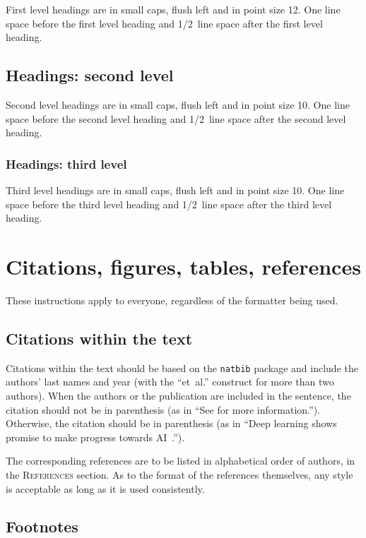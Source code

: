 \documentclass{article} %
\begin{document}
First level headings are in small caps,
flush left and in point size 12. One line space before the first level
heading and 1/2~line space after the first level heading.

\subsection{Headings: second level}

Second level headings are in small caps,
flush left and in point size 10. One line space before the second level
heading and 1/2~line space after the second level heading.

\subsubsection{Headings: third level}

Third level headings are in small caps,
flush left and in point size 10. One line space before the third level
heading and 1/2~line space after the third level heading.

\section{Citations, figures, tables, references}
\label{others}

These instructions apply to everyone, regardless of the formatter being used.

\subsection{Citations within the text}

Citations within the text should be based on the {\tt natbib} package
and include the authors' last names and year (with the ``et~al.'' construct
for more than two authors). When the authors or the publication are
included in the sentence, the citation should not be in parenthesis (as
in ``See \citet{Hinton06} for more information.''). Otherwise, the citation
should be in parenthesis (as in ``Deep learning shows promise to make progress towards AI~\citep{Bengio+chapter2007}.'').

The corresponding references are to be listed in alphabetical order of
authors, in the \textsc{References} section. As to the format of the
references themselves, any style is acceptable as long as it is used
consistently.

\subsection{Footnotes}
\end{document}
